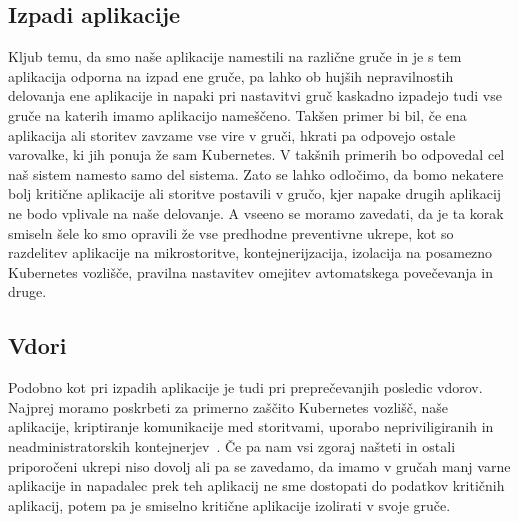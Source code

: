 \documentclass[a4paper, 12pt]{book}
\begin{document}
\subsection{Izpadi aplikacije}
Kljub temu, da smo naše aplikacije namestili na različne gruče in je s tem aplikacija odporna na izpad ene gruče, pa lahko ob hujših nepravilnostih delovanja ene aplikacije in napaki pri nastavitvi gruč kaskadno izpadejo tudi vse gruče na katerih imamo aplikacijo nameščeno.
Takšen primer bi bil, če ena aplikacija ali storitev zavzame vse vire v gruči, hkrati pa odpovejo ostale varovalke, ki jih ponuja že sam Kubernetes.
V takšnih primerih bo odpovedal cel naš sistem namesto samo del sistema.
Zato se lahko odločimo, da bomo nekatere bolj kritične aplikacije ali storitve postavili v gručo, kjer napake drugih aplikacij ne bodo vplivale na naše delovanje.
A vseeno se moramo zavedati, da je ta korak smiseln šele ko smo opravili že vse predhodne preventivne ukrepe, kot so razdelitev aplikacije na mikrostoritve, kontejnerijzacija, izolacija na posamezno Kubernetes vozlišče, pravilna nastavitev omejitev avtomatskega povečevanja in druge.
\subsection{Vdori}
Podobno kot pri izpadih aplikacije je tudi pri preprečevanjih posledic vdorov.
Najprej moramo poskrbeti za primerno zaščito Kubernetes vozlišč, naše aplikacije, kriptiranje komunikacije med storitvami, uporabo nepriviligiranih in neadministratorskih kontejnerjev~\cite{securing-kube}.
Če pa nam vsi zgoraj našteti in ostali priporočeni ukrepi niso dovolj ali pa se zavedamo, da imamo v gručah manj varne aplikacije in napadalec prek teh aplikacij ne sme dostopati do podatkov kritičnih aplikacij, potem pa je smiselno kritične aplikacije izolirati v svoje gruče.
\end{document}

